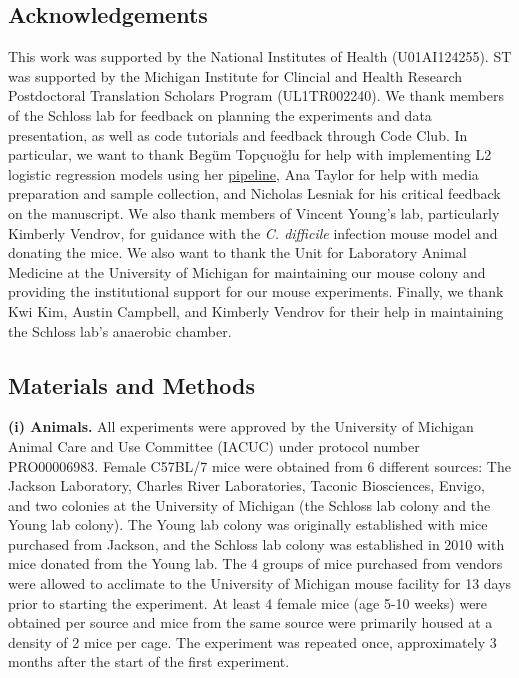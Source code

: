 \documentclass[
  11pt,
]{article}
\begin{document}
\newpage

\hypertarget{acknowledgements}{%
\subsection{Acknowledgements}\label{acknowledgements}}

This work was supported by the National Institutes of Health
(U01AI124255). ST was supported by the Michigan Institute for Clincial
and Health Research Postdoctoral Translation Scholars Program
(UL1TR002240). We thank members of the Schloss lab for feedback on
planning the experiments and data presentation, as well as code
tutorials and feedback through Code Club. In particular, we want to
thank Begüm Topçuoğlu for help with implementing L2 logistic regression
models using her
\href{https://github.com/SchlossLab/ML_pipeline_microbiome}{pipeline},
Ana Taylor for help with media preparation and sample collection, and
Nicholas Lesniak for his critical feedback on the manuscript. We also
thank members of Vincent Young's lab, particularly Kimberly Vendrov, for
guidance with the \emph{C. difficile} infection mouse model and donating
the mice. We also want to thank the Unit for Laboratory Animal Medicine
at the University of Michigan for maintaining our mouse colony and
providing the institutional support for our mouse experiments. Finally,
we thank Kwi Kim, Austin Campbell, and Kimberly Vendrov for their help
in maintaining the Schloss lab's anaerobic chamber.

\newpage

\hypertarget{materials-and-methods}{%
\subsection{Materials and Methods}\label{materials-and-methods}}

\textbf{(i) Animals.} All experiments were approved by the University of
Michigan Animal Care and Use Committee (IACUC) under protocol number
PRO00006983. Female C57BL/7 mice were obtained from 6 different sources:
The Jackson Laboratory, Charles River Laboratories, Taconic Biosciences,
Envigo, and two colonies at the University of Michigan (the Schloss lab
colony and the Young lab colony). The Young lab colony was originally
established with mice purchased from Jackson, and the Schloss lab colony
was established in 2010 with mice donated from the Young lab. The 4
groups of mice purchased from vendors were allowed to acclimate to the
University of Michigan mouse facility for 13 days prior to starting the
experiment. At least 4 female mice (age 5-10 weeks) were obtained per
source and mice from the same source were primarily housed at a density
of 2 mice per cage. The experiment was repeated once, approximately 3
months after the start of the first experiment.
\end{document}
